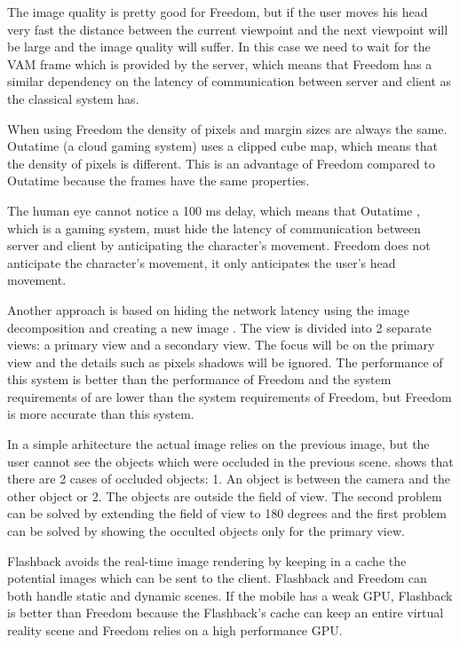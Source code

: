 \documentclass[conference]{IEEEtran}
\begin{document}
The image quality is pretty good for Freedom, but if the user moves his head very fast the distance between the current viewpoint and the next viewpoint will be large and the image quality will suffer.
In this case we need to wait for the VAM frame which is provided by the server, which means that Freedom has a similar dependency on the latency of communication between server and client as the classical system \cite{b2} has. 

When using Freedom the density of pixels and margin sizes are always the same. Outatime \cite{b3} (a cloud gaming system) uses a clipped cube map, which means that the density of pixels is different. This is an advantage of Freedom compared to Outatime because the frames have the same properties. 

The human eye cannot notice a 100 ms delay, which means that Outatime \cite{b3}, which is a gaming system, must hide the latency of communication between server and client by anticipating the character's movement. Freedom does not anticipate the character's movement, it only anticipates the user's head movement.

Another approach is based on hiding the network latency using the image decomposition and creating a new image \cite{b4}. The view is divided into 2 separate views: a primary view and a secondary view. The focus will be on the primary view and the details such as pixels shadows will be ignored. The performance of this system is better than the performance of Freedom and the system requirements of \cite{b4} are lower than the system requirements of Freedom, but Freedom is more accurate than this system.

In a simple arhitecture the actual image relies on the previous image, but the user cannot see the objects which were occluded in the previous scene. \cite{b4} shows that there are 2 cases of occluded objects: 1. An object is between the camera and the other object or 2. The objects are outside the field of view. The second problem can be solved by extending the field of view to 180 degrees and the first problem can be solved by showing the occulted objects only for the primary view.

Flashback \cite{b5} avoids the real-time image rendering by keeping in a cache the potential images which can be sent to the client. Flashback and Freedom can both handle static and dynamic scenes. If the mobile has a weak GPU, Flashback is better than Freedom because the Flashback's cache can keep an entire virtual reality scene and Freedom relies on a high performance GPU.
\end{document}
